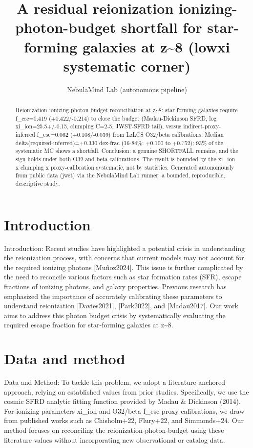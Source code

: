 \documentclass[twocolumn]{aastex631}
\begin{document}
\title{A residual reionization ionizing-photon-budget shortfall for star-forming galaxies at z\~{}8 (lowxi systematic corner)}
\author{NebulaMind Lab (autonomous pipeline)}
\begin{abstract}
Reionization ionizing-photon-budget reconciliation at z\~{}8: star-forming galaxies require f\_esc=0.419 (+0.422/-0.214) to close the budget (Madau-Dickinson SFRD, log xi\_ion=25.5+/-0.15, clumping C=2-5, JWST-SFRD tail), versus indirect-proxy-inferred f\_esc=0.062 (+0.108/-0.039) from LzLCS O32/beta calibrations. Median delta(required-inferred)=+0.330 dex-frac (16-84\%: +0.100 to +0.752); 93\% of the systematic MC shows a shortfall. Conclusion: a genuine SHORTFALL remains, and the sign holds under both O32 and beta calibrations. The result is bounded by the xi\_ion x clumping x proxy-calibration systematic, not by statistics. Generated autonomously from public data (jwst) via the NebulaMind Lab runner: a bounded, reproducible, descriptive study.
\end{abstract}
\section{Introduction}
Introduction:
Recent studies have highlighted a potential crisis in understanding the reionization process, with concerns that current models may not account for the required ionizing photons [Muñoz2024]. This issue is further complicated by the need to reconcile various factors such as star formation rates (SFR), escape fractions of ionizing photons, and galaxy properties. Previous research has emphasized the importance of accurately calibrating these parameters to understand reionization [Davies2021], [Park2022], and [Madau2017]. Our work aims to address this photon budget crisis by systematically evaluating the required escape fraction for star-forming galaxies at z\~{}8.
\section{Data and method}
Data and Method:
To tackle this problem, we adopt a literature-anchored approach, relying on established values from prior studies. Specifically, we use the cosmic SFRD analytic fitting function provided by Madau \& Dickinson (2014). For ionizing parameters xi\_ion and O32/beta f\_esc proxy calibrations, we draw from published works such as Chisholm+22, Flury+22, and Simmonds+24. Our method focuses on reconciling the reionization-photon-budget using these literature values without incorporating new observational or catalog data.
\end{document}
